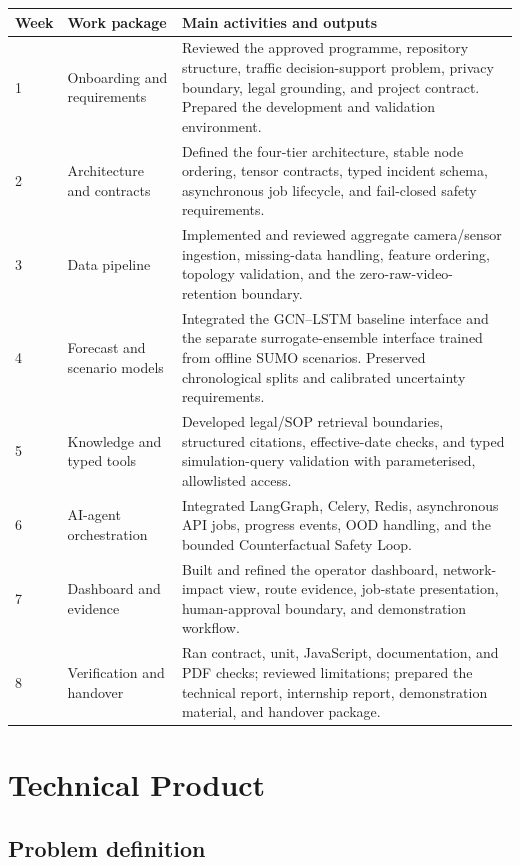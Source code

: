 \documentclass[12pt,a4paper]{report}
\begin{document}
\begin{longtable}{L{1.2cm}L{3.5cm}L{8.7cm}}
\toprule
\textbf{Week} & \textbf{Work package} & \textbf{Main activities and outputs}\\
\midrule
{} & Onboarding and requirements & Reviewed the approved programme, repository structure, traffic decision-support problem, privacy boundary, legal grounding, and project contract. Prepared the development and validation environment.\\
2 & Architecture and contracts & Defined the four-tier architecture, stable node ordering, tensor contracts, typed incident schema, asynchronous job lifecycle, and fail-closed safety requirements.\\
3 & Data pipeline & Implemented and reviewed aggregate camera/sensor ingestion, missing-data handling, feature ordering, topology validation, and the zero-raw-video-retention boundary.\\
4 & Forecast and scenario models & Integrated the GCN--LSTM baseline interface and the separate surrogate-ensemble interface trained from offline SUMO scenarios. Preserved chronological splits and calibrated uncertainty requirements.\\
5 & Knowledge and typed tools & Developed legal/SOP retrieval boundaries, structured citations, effective-date checks, and typed simulation-query validation with parameterised, allowlisted access.\\
6 & AI-agent orchestration & Integrated LangGraph, Celery, Redis, asynchronous API jobs, progress events, OOD handling, and the bounded Counterfactual Safety Loop.\\
7 & Dashboard and evidence & Built and refined the operator dashboard, network-impact view, route evidence, job-state presentation, human-approval boundary, and demonstration workflow.\\
8 & Verification and handover & Ran contract, unit, JavaScript, documentation, and PDF checks; reviewed limitations; prepared the technical report, internship report, demonstration material, and handover package.\\
\bottomrule
\end{longtable}

\chapter{Technical Product}

\section{Problem definition}
\end{document}
